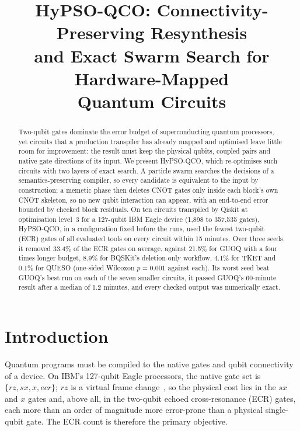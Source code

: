 \documentclass[conference,letterpaper]{IEEEtran}
\newcommand{\hypso}{HyPSO-QCO}
\begin{document}
\title{HyPSO-QCO: Connectivity-Preserving Resynthesis\\ and Exact Swarm Search for Hardware-Mapped\\ Quantum Circuits}

\author{
}

\maketitle

\begin{abstract}
Two-qubit gates dominate the error budget of superconducting quantum processors, yet circuits that a
production transpiler has already mapped and optimised leave little room for improvement: the result must
keep the physical qubits, coupled pairs and native gate directions of its input. We present \hypso{}, which
re-optimises such circuits with two layers of exact search. A particle swarm searches the decisions of a
semantics-preserving compiler, so every candidate is equivalent to the input by construction; a memetic phase
then deletes CNOT gates only inside each block's own CNOT skeleton, so no new qubit interaction can appear,
with an end-to-end error bounded by checked block residuals. On ten circuits transpiled by Qiskit at
optimisation level~3 for a 127-qubit IBM Eagle device (1,898 to 357,535 gates), \hypso{}, in a configuration
fixed before the runs, used the fewest two-qubit (ECR) gates of all evaluated tools on every circuit within
15 minutes. Over three seeds, it removed 33.4\% of the ECR gates on average, against 21.5\% for GUOQ with a
four times longer budget, 8.9\% for BQSKit's deletion-only workflow, 4.1\% for TKET and 0.1\% for QUESO
(one-sided Wilcoxon $p = 0.001$ against each). Its worst seed beat GUOQ's best run on each of the seven
smaller circuits, it passed GUOQ's 60-minute result after a median of 1.2 minutes, and every checked output
was numerically exact.
\end{abstract}

\section{Introduction}



Quantum programs must be compiled to the native gates and qubit connectivity of a device. On IBM's 127-qubit
Eagle processors, the native gate set is $\{rz, sx, x, ecr\}$; $rz$ is a virtual frame change~\cite{mckay2017},
so the physical cost lies in the $sx$ and $x$ gates and, above all, in the two-qubit echoed cross-resonance
(ECR) gates, each more than an order of magnitude more error-prone than a physical single-qubit gate. The ECR
count is therefore the primary objective.
\end{document}
